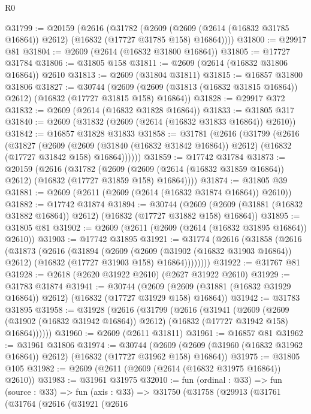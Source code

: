 \begin{lexlean}{R0}
\begin{coremodule}
@31799 := @20159
    (@2616
      (@31782
        (@2609 (@2609 (@2614 (@16832 @31785 @16864)) @2612) (@16832 (@17727 @31785 @158) @16864))))
@31800 := @29917 @81
@31804 := @2609 (@2614 (@16832 @31800 @16864))
@31805 := @17727 @31784
@31806 := @31805 @158
@31811 := @2609 (@2614 (@16832 @31806 @16864)) @2610
@31813 := @2609 (@31804 @31811)
@31815 := @16857 @31800 @31806
@31827 := @30744
    (@2609 (@2609 (@31813 (@16832 @31815 @16864)) @2612) (@16832 (@17727 @31815 @158) @16864))
@31828 := @29917 @372
@31832 := @2609 (@2614 (@16832 @31828 @16864))
@31833 := @31805 @317
@31840 := @2609 (@31832 (@2609 (@2614 (@16832 @31833 @16864)) @2610))
@31842 := @16857 @31828 @31833
@31858 := @31781
    (@2616
      (@31799
        (@2616
          (@31827
            (@2609
              (@2609 (@31840 (@16832 @31842 @16864)) @2612)
              (@16832 (@17727 @31842 @158) @16864))))))
@31859 := @17742 @31784
@31873 := @20159
    (@2616
      (@31782
        (@2609 (@2609 (@2614 (@16832 @31859 @16864)) @2612) (@16832 (@17727 @31859 @158) @16864))))
@31874 := @31805 @39
@31881 := @2609 (@2611 (@2609 (@2614 (@16832 @31874 @16864)) @2610))
@31882 := @17742 @31874
@31894 := @30744
    (@2609 (@2609 (@31881 (@16832 @31882 @16864)) @2612) (@16832 (@17727 @31882 @158) @16864))
@31895 := @31805 @81
@31902 := @2609 (@2611 (@2609 (@2614 (@16832 @31895 @16864)) @2610))
@31903 := @17742 @31895
@31921 := @31774
    (@2616
      (@31858
        (@2616
          (@31873
            (@2616
              (@31894
                (@2609
                  (@2609 (@31902 (@16832 @31903 @16864)) @2612)
                  (@16832 (@17727 @31903 @158) @16864))))))))
@31922 := @31767 @81
@31928 := @2618 (@2620 @31922 @2610) (@2627 @31922 @2610)
@31929 := @31783 @31874
@31941 := @30744
    (@2609 (@2609 (@31881 (@16832 @31929 @16864)) @2612) (@16832 (@17727 @31929 @158) @16864))
@31942 := @31783 @31895
@31958 := @31928
    (@2616
      (@31799
        (@2616
          (@31941
            (@2609
              (@2609 (@31902 (@16832 @31942 @16864)) @2612)
              (@16832 (@17727 @31942 @158) @16864))))))
@31960 := @2609 (@2611 @31811)
@31961 := @16857 @81
@31962 := @31961 @31806
@31974 := @30744
    (@2609 (@2609 (@31960 (@16832 @31962 @16864)) @2612) (@16832 (@17727 @31962 @158) @16864))
@31975 := @31805 @105
@31982 := @2609 (@2611 (@2609 (@2614 (@16832 @31975 @16864)) @2610))
@31983 := @31961 @31975
@32010 := fun (ordinal : @33) =>
  fun (source : @33) =>
  fun (axis : @33) =>
  @31750
    (@31758
      (@29913
        (@31761
          (@31764
            (@2616
              (@31921
                (@2616

\end{coremodule}
\end{lexlean}
